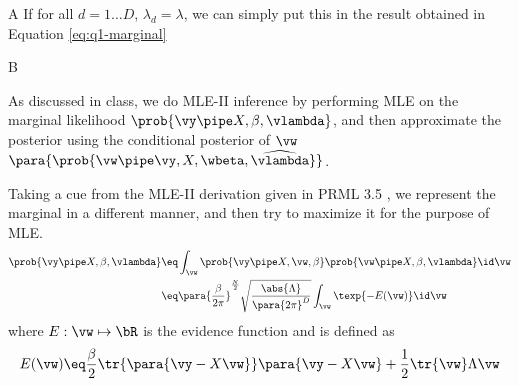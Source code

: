\documentclass{article}
\begin{document}
\begin{question}
\begin{qpart}{A}
		If for all $d = 1 \dots D$, $\lambda_d = \lambda$, we can simply put this in the result obtained in Equation \ref{eq:q1-marginal}

	\end{qpart}

	\begin{qpart}{B}

		As discussed in class, we do MLE-II inference by performing MLE on the marginal likelihood $\prob{\vy \pipe X, \beta, \vlambda}$, and then approximate the posterior using the conditional posterior of $\vw$ $\para{\prob{\vw \pipe \vy, X, \wbeta, \widehat{\vlambda}}}$. \br


		Taking a cue from the MLE-II derivation given in PRML 3.5 \cite{prml}, we represent the marginal in a different manner, and then try to maximize it for the purpose of MLE.
		\begin{align*}
			\prob{\vy \pipe X, \beta, \vlambda}	&\eq	\int_{\vw} \prob{\vy \pipe X, \vw, \beta} \prob{\vw \pipe X, \beta, \vlambda} \id \vw \\
			&\eq	\para{\frac{\beta}{2\pi}}^{\frac{N}{2}} \sqrt{\frac{\abs{\Lambda}}{\para{2 \pi}^D}} \int_{\vw} \texp{- E(\vw)} \id \vw
		\end{align*}
		where $E : \vw \mapsto \bR$ is the evidence function \cite{prml} and is defined as
		\begin{align*}
			E(\vw)	\eq	\frac{\beta}{2} \tr{\para{\vy - X \vw}} \para{\vy - X \vw} + \frac{1}{2} \tr{\vw} \Lambda \vw
		\end{align*}


\end{qpart}
\end{question}
\end{document}

